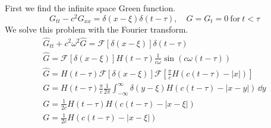 {%
\begin{Solution}
  First we find the infinite space Green function.
  \[
  G_{t t} - c^2 G_{x x} = \delta(x - \xi) \delta(t - \tau), \quad
  G = G_t = 0\ \mathrm{for}\ t < \tau
  \]
  We solve this problem with the Fourier transform.
  \begin{gather*}
    \hat{G}_{t t} + c^2 \omega^2 \hat{G} 
    = \mathcal{F}[\delta(x-\xi)] \delta(t-\tau) \\
    \hat{G} = \mathcal{F}[\delta(x-\xi)] H(t-\tau) \frac{1}{c \omega}
    \sin( c \omega (t - \tau)) \\
    \hat{G} = H(t-\tau) \mathcal{F}[\delta(x-\xi)] 
    \mathcal{F} \left[ \frac{\pi}{c} H(c (t-\tau) - |x|) \right] \\
    G = H(t-\tau) \frac{\pi}{c} \frac{1}{2\pi} \int_{-\infty}^\infty
    \delta(y - \xi) H(c (t-\tau) - |x - y| ) \,\dd y \\
    G = \frac{1}{2c} H(t-\tau) H(c (t-\tau) - |x - \xi| ) \\
    G = \frac{1}{2c} H(c (t-\tau) - |x - \xi| )
  \end{gather*}


\end{Solution}}
